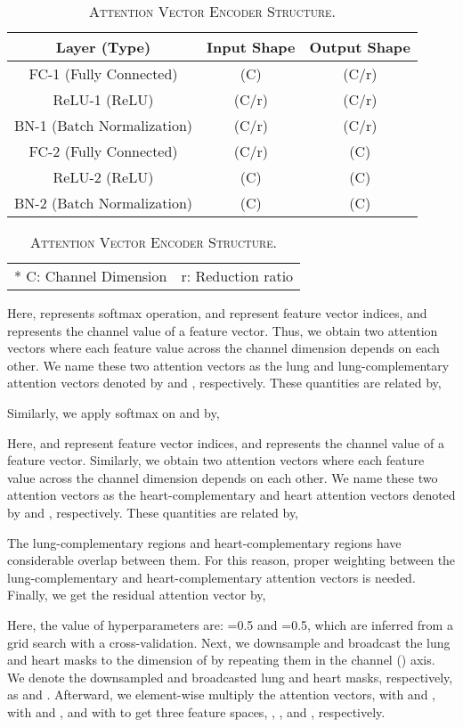 \documentclass[journal]{IEEEtran}
\begin{document}
\begin{table}[b]
    \centering
    \caption{\textsc{Attention Vector Encoder Structure.}} 
        \begin{tabular}{ccc} 
        \toprule
        \bf Layer (Type) & \bf Input Shape & \bf Output Shape \\ 
        \hline
        \hline
        FC-1 (Fully Connected) & (C) & (C/r) \\
        ReLU-1 (ReLU) & (C/r) & (C/r) \\
        BN-1 (Batch Normalization) & (C/r) & (C/r)  \\
        FC-2 (Fully Connected) & (C/r) & (C) \\
        ReLU-2 (ReLU) & (C) & (C)  \\
        BN-2 (Batch Normalization) & (C) & (C)  \\
        \bottomrule
        \end{tabular}
    \label{attn_vct_encoder_structure_table}
        \begin{tabular}{cc}
            * C: Channel Dimension & r: Reduction ratio
        \end{tabular}
\end{table}

Here,  represents softmax operation,  and  represent feature vector indices, and  represents the  channel value of a feature vector. Thus, we obtain two attention vectors where each feature value across the channel dimension depends on each other. We name these two attention vectors as the lung and lung-complementary attention vectors denoted by  and , respectively. These quantities are related by,

Similarly, we apply softmax on  and  by,

Here,  and  represent feature vector indices, and  represents the  channel value of a feature vector. Similarly, we obtain two attention vectors where each feature value across the channel dimension depends on each other. We name these two attention vectors as the heart-complementary and heart attention vectors denoted by  and , respectively. These quantities are related by,

The lung-complementary regions and heart-complementary regions have considerable overlap between them. For this reason, proper weighting between the lung-complementary and heart-complementary attention vectors is needed. Finally, we get the residual attention vector by,

Here, the value of hyperparameters are: =0.5 and =0.5, which are inferred from a grid search with a cross-validation. Next, we downsample and broadcast the lung and heart masks to the dimension of  by repeating them in the channel () axis. We denote the downsampled and broadcasted lung and heart masks, respectively, as  and . Afterward, we element-wise multiply the attention vectors,  with  and ,  with  and , and  with  to get three feature spaces, , , and , respectively.
\end{document}
